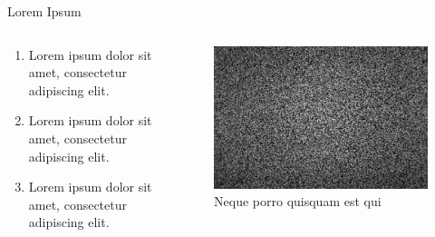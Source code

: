 \documentclass[UKenglish, aspectratio = 169]{beamer}
\begin{document}
\begin{frame}{Lorem Ipsum}
	\begin{columns}
		\begin{column}{0.4\textwidth}
			\begin{enumerate}[<+->]
				\item<1-> Lorem ipsum dolor sit amet, consectetur adipiscing elit.
				\item<2-> Lorem ipsum dolor sit amet, consectetur adipiscing elit.
				\item<3-> Lorem ipsum dolor sit amet, consectetur adipiscing elit.
			\end{enumerate}
		\end{column}
			\begin{column}{0.4\textwidth}
				\onslide<1->
		\begin{figure}
			\centering
			\parbox{\linewidth}{\includegraphics{figs/stock photo.jpg}}
			\caption{\tiny{Neque porro quisquam est qui }}
		\end{figure}
	\end{column}
	\end{columns}
\end{frame}
\end{document}
